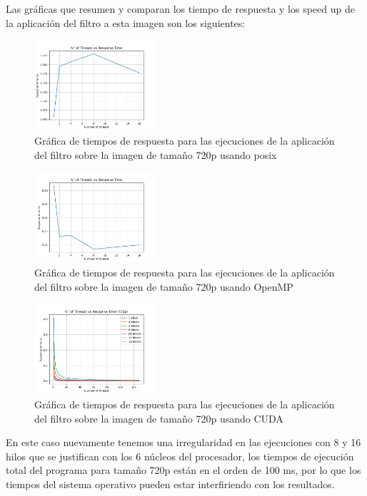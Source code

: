 Las gráficas que resumen y comparan los tiempo de respuesta y los speed up de la aplicación del filtro a esta imagen son los siguientes:

\begin{figure}[H]
    \centering
    \includegraphics[width=0.4\textwidth]{../plots/720p_response_time.png}
    \caption{Gráfica de tiempos de respuesta para las ejecuciones de la aplicación del filtro sobre la imagen de tamaño 720p usando posix}
\end{figure}

\begin{figure}[H]
    \centering
    \includegraphics[width=0.4\textwidth]{../plots/omp_720p_response_time.png}
    \caption{Gráfica de tiempos de respuesta para las ejecuciones de la aplicación del filtro sobre la imagen de tamaño 720p usando OpenMP}
\end{figure}

\begin{figure}[H]
    \centering
    \includegraphics[width=0.4\textwidth]{../plots/cuda_720p_response_time.png}
    \caption{Gráfica de tiempos de respuesta para las ejecuciones de la aplicación del filtro sobre la imagen de tamaño 720p usando CUDA}
\end{figure}

En este caso nuevamente tenemos una irregularidad en las ejecuciones con 8 y 16 hilos que se justifican con los 6 núcleos del procesador, los tiempos de ejecución total del programa para tamaño 720p están en el orden de 100 ms, por lo que los tiempos del sistema operativo pueden estar interfiriendo con los resultados.

